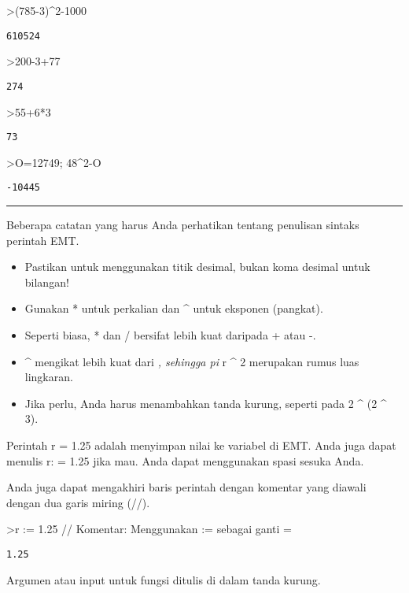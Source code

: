 \documentclass[
]{book}
\providecommand{\tightlist}{%
  \setlength{\itemsep}{0pt}\setlength{\parskip}{0pt}}
\begin{document}
\textgreater(785-3)\^{}2-1000

\begin{verbatim}
610524
\end{verbatim}

\textgreater200-3+77

\begin{verbatim}
274
\end{verbatim}

\textgreater55+6*3

\begin{verbatim}
73
\end{verbatim}

\textgreater O=12749; 48\^{}2-O

\begin{verbatim}
-10445
\end{verbatim}

\begin{center}\rule{0.5\linewidth}{0.5pt}\end{center}

Beberapa catatan yang harus Anda perhatikan tentang penulisan sintaks perintah EMT.

\begin{itemize}
\tightlist
\item
  Pastikan untuk menggunakan titik desimal, bukan koma desimal untuk bilangan!
\item
  Gunakan * untuk perkalian dan \^{} untuk eksponen (pangkat).
\item
  Seperti biasa, * dan / bersifat lebih kuat daripada + atau -.
\item
  \^{} mengikat lebih kuat dari \emph{, sehingga pi } r \^{} 2 merupakan rumus luas lingkaran.
\item
  Jika perlu, Anda harus menambahkan tanda kurung, seperti pada 2 \^{} (2 \^{} 3).
\end{itemize}

Perintah r = 1.25 adalah menyimpan nilai ke variabel di EMT. Anda juga dapat menulis r: = 1.25 jika mau. Anda dapat menggunakan spasi sesuka Anda.

Anda juga dapat mengakhiri baris perintah dengan komentar yang diawali dengan dua garis miring (//).

\textgreater r := 1.25 // Komentar: Menggunakan := sebagai ganti =

\begin{verbatim}
1.25
\end{verbatim}

Argumen atau input untuk fungsi ditulis di dalam tanda kurung.
\end{document}
